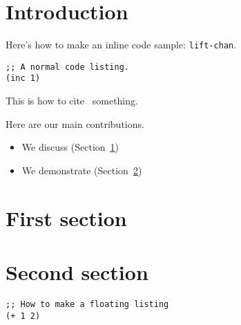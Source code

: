 \documentclass[preprint]{sigplanconf}
\begin{document}

\begin{abstract}
\end{abstract}





\section*{Introduction}


Here's how to make an inline code sample: \lstinline|lift-chan|.

\begin{lstlisting}
;; A normal code listing.
(inc 1)
\end{lstlisting}

This is how to cite~\cite{Tob10} something.


Here are our main contributions.

\begin{itemize}
  \item We discuss (Section~\ref{first})
  \item We demonstrate (Section~\ref{second})
\end{itemize}

\section{First section}
\label{first}

\section{Second section}
\label{second}

\begin{lstlisting}[float]
;; How to make a floating listing
(+ 1 2)
\end{lstlisting}

\printbibliography[title=References]
\end{document}
